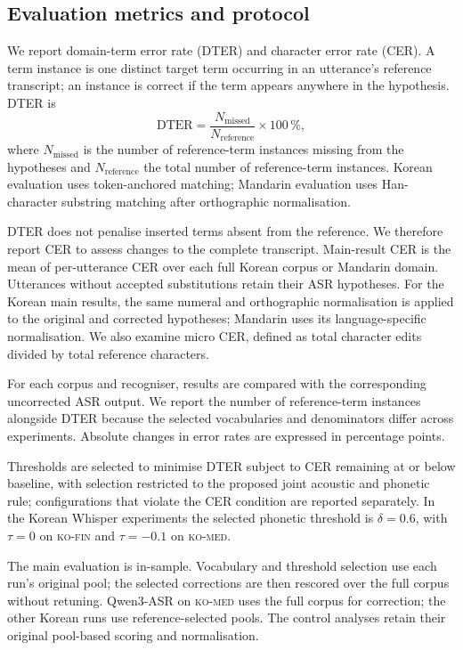 \documentclass{article}
\newcommand{\corpA}{\textsc{ko-fin}}
\newcommand{\corpB}{\textsc{ko-med}}
\begin{document}
\subsection{Evaluation metrics and protocol}

We report domain-term error rate (DTER) and character error rate (CER). A term instance is one distinct target term occurring in an utterance's reference transcript; an instance is correct if the term appears anywhere in the hypothesis. DTER is
\begin{equation}
\mathrm{DTER} = \frac{N_{\mathrm{missed}}}{N_{\mathrm{reference}}}\times 100\,\% ,
\label{eq:dter}
\end{equation}
where $N_{\mathrm{missed}}$ is the number of reference-term instances missing from the hypotheses and $N_{\mathrm{reference}}$ the total number of reference-term instances. Korean evaluation uses token-anchored matching; Mandarin evaluation uses Han-character substring matching after orthographic normalisation.

DTER does not penalise inserted terms absent from the reference. We therefore report CER to assess changes to the complete transcript. Main-result CER is the mean of per-utterance CER over each full Korean corpus or Mandarin domain. Utterances without accepted substitutions retain their ASR hypotheses. For the Korean main results, the same numeral and orthographic normalisation is applied to the original and corrected hypotheses; Mandarin uses its language-specific normalisation. We also examine micro CER, defined as total character edits divided by total reference characters.


For each corpus and recogniser, results are compared with the corresponding uncorrected ASR output. We report the number of reference-term instances alongside DTER because the selected vocabularies and denominators differ across experiments. Absolute changes in error rates are expressed in percentage points.

Thresholds are selected to minimise DTER subject to CER remaining at or below baseline, with selection restricted to the proposed joint acoustic and phonetic rule; configurations that violate the CER condition are reported separately. In the Korean Whisper experiments the selected phonetic threshold is
$\delta = 0.6$, with $\tau = 0$ on \corpA{} and $\tau = -0.1$ on \corpB{}.
 
The main evaluation is in-sample. Vocabulary and threshold selection use each run's original pool; the selected corrections are then rescored over the full corpus without retuning. Qwen3-ASR on \corpB{} uses the full corpus for correction; the other Korean runs use reference-selected pools. The control analyses retain their original pool-based scoring and normalisation.
\end{document}
